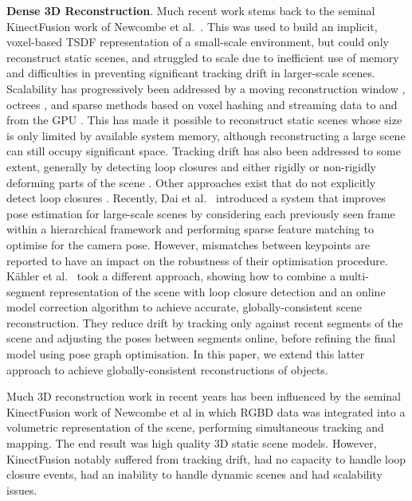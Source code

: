 \textbf{Dense 3D Reconstruction}. Much recent work stems back to the seminal KinectFusion work of Newcombe et al.\ \cite{Newcombe2011}. This was used to build an implicit, voxel-based TSDF representation \cite{Curless1996} of a small-scale environment, but could only reconstruct static scenes, and struggled to scale due to inefficient use of memory and difficulties in preventing significant tracking drift in larger-scale scenes. Scalability has progressively been addressed by a moving reconstruction window \cite{Roth2012,Whelan2012}, octrees \cite{Zeng2012}, and sparse methods based on voxel hashing and streaming data to and from the GPU \cite{Niessner2013,Prisacariu2014}. This has made it possible to reconstruct static scenes whose size is only limited by available system memory, although reconstructing a large scene can still occupy significant space. Tracking drift has also been addressed to some extent, generally by detecting loop closures and either rigidly or non-rigidly deforming parts of the scene \cite{Zhou2013,Whelan2015IJRR,Whelan2015RSS}. Other approaches exist that do not explicitly detect loop closures \cite{Fioraio2015}. Recently, Dai et al.\ \cite{dai2016bundlefusion} introduced a system that improves pose estimation for large-scale scenes by considering each previously seen frame within a hierarchical framework and performing sparse feature matching to optimise for the camera pose. However, mismatches between keypoints are reported to have an impact on the robustness of their optimisation procedure. K{\"a}hler et al.\ \cite{Kahler2016} took a different approach, showing how to combine a multi-segment representation of the scene with loop closure detection and an online model correction algorithm to achieve accurate, globally-consistent scene reconstruction. They reduce drift by tracking only against recent segments of the scene and adjusting the poses between segments online, before refining the final model using pose graph optimisation. In this paper, we extend this latter approach to achieve globally-consistent reconstructions of objects.


\iffalse
Much 3D reconstruction work in recent years has been influenced by the seminal KinectFusion work \cite{Newcombe2011} of Newcombe et al in which
RGBD data was integrated into a volumetric representation of the scene, performing simultaneous tracking and mapping. The end result was
high quality 3D static scene models. 
However, KinectFusion notably suffered from tracking drift, had no capacity to handle loop closure events, had an inability to handle dynamic scenes 
and had scalability issues.

